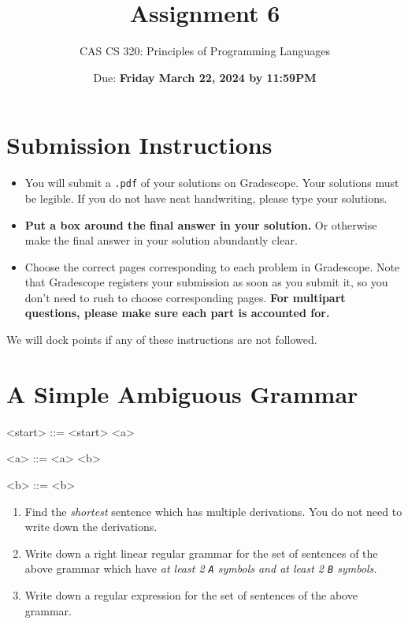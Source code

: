 \documentclass{article}
\title{
Assignment 6
}
\author{CAS CS 320: Principles of Programming Languages}
\date{Due: \textbf{Friday March 22, 2024 by 11:59PM}}
\theoremstyle{remark} \newtheorem*{solution}{Solution}
\begin{document}
\maketitle
\section*{Submission Instructions}
\begin{itemize}
\item
You will submit a \texttt{.pdf} of your solutions on Gradescope.  Your
solutions must be legible. If you do not have neat handwriting, please
type your solutions.
\item
\textbf{Put a box around the final answer in your solution.}  Or
otherwise make the final answer in your solution abundantly clear.
\item
Choose the correct pages corresponding to each problem in Gradescope.
Note that Gradescope registers your submission as soon as you submit
it, so you don’t need to rush to choose corresponding pages.
\textbf{For multipart questions, please make sure each part is
  accounted for.}
\end{itemize}
We will dock points if any of these instructions are not followed.

\pagebreak
\section{A Simple Ambiguous Grammar}

\begin{mdframed}
\begin{grammar}
<start> ::=  <start> 
\alt <a>

<a> ::=  <a>
\alt {} <b>

<b> ::=   <b>
\alt {} 

\end{grammar}
\end{mdframed}

\begin{enumerate}
\item
Find the \textit{shortest} sentence which has multiple
derivations. You do not need to write down the derivations.
\item
Write down a right linear regular grammar for the set of sentences of
the above grammar which have \textit{at least 2 \texttt{A} symbols and
  at least 2 \texttt{B} symbols.}
\item
Write down a regular expression for the set of sentences of the above
grammar.

\end{enumerate}
\end{document}
